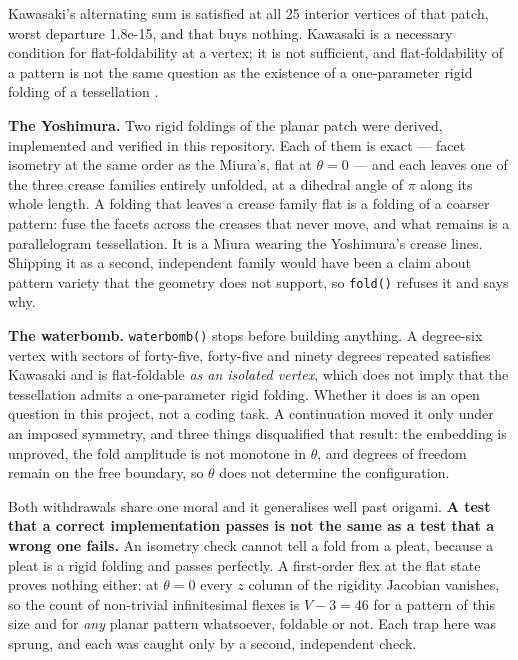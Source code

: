 \documentclass[
  british,
  a4paper,
]{book}
\begin{document}
Kawasaki's alternating sum is satisfied at all
25 interior vertices of that patch, worst
departure 1.8e-15, and that buys
nothing. Kawasaki is a necessary condition for flat-foldability at a vertex; it
is not sufficient, and
flat-foldability of a pattern is not the same question as the existence of a
one-parameter rigid folding of a tessellation \citep{hull2020origametry, demaine2007folding}.

\textbf{The Yoshimura.} Two rigid foldings of the planar patch were derived,
implemented and verified in this repository. Each of them is exact --- facet
isometry at the same order as the Miura's, flat at \(\theta = 0\) --- and each
leaves one of the three crease families entirely unfolded, at a dihedral angle
of \(\pi\) along its whole length. A folding that leaves a crease family flat is a
folding of a coarser pattern: fuse the facets across the creases that never
move, and what remains is a parallelogram tessellation. It is a Miura wearing
the Yoshimura's crease lines. Shipping it as a second, independent family would
have been a claim about pattern variety that the geometry does not support, so
\texttt{fold()} refuses it and says why.

\textbf{The waterbomb.} \texttt{waterbomb()} stops before building anything. A degree-six
vertex with sectors of forty-five, forty-five and ninety degrees repeated
satisfies Kawasaki and is flat-foldable \emph{as an isolated vertex}, which does not
imply that the tessellation admits a one-parameter rigid folding. Whether it
does is an open question in this project, not a coding task. A continuation
moved it only under an imposed symmetry, and three things disqualified that
result: the embedding is unproved, the fold amplitude is not monotone in
\(\theta\), and degrees of freedom remain on the free boundary, so \(\theta\) does
not determine the configuration.

Both withdrawals share one moral and it generalises well past origami. \textbf{A test
that a correct implementation passes is not the same as a test that a wrong one
fails.} An isometry check cannot tell a fold from a pleat, because a pleat is a
rigid folding and passes perfectly. A first-order flex at the flat state proves
nothing either: at \(\theta = 0\) every \(z\) column of the rigidity Jacobian
vanishes, so the count of non-trivial infinitesimal flexes is
\(V - 3 = 46\) for a pattern of this size and for \emph{any}
planar pattern whatsoever, foldable or not. Each trap here was sprung, and each
was caught only by a second, independent check.
\end{document}
